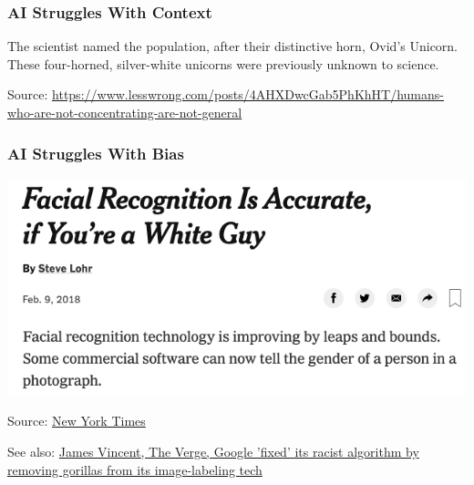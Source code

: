 \begin{frame}
\frametitle{AI Struggles With Context}
The scientist named the population, after their distinctive horn, Ovid’s Unicorn. These four-horned, silver-white unicorns were previously unknown to science.\newline

Source: \href{https://www.lesswrong.com/posts/4AHXDwcGab5PhKhHT/humans-who-are-not-concentrating-are-not-general}{https://www.lesswrong.com/posts/4AHXDwcGab5PhKhHT/humans-who-are-not-concentrating-are-not-general}
\end{frame}

\begin{frame}
\frametitle{AI Struggles With Bias}
\includegraphics[width=\textwidth]{graphics/facial_bias}

Source: \href{https://www.nytimes.com/2018/02/09/technology/facial-recognition-race-artificial-intelligence.html}{New York Times}

See also: \href{https://www.theverge.com/2018/1/12/16882408/google-racist-gorillas-photo-recognition-algorithm-ai}{James Vincent, The Verge, Google 'fixed' its racist algorithm by removing gorillas from its image-labeling tech}
\end{frame}


